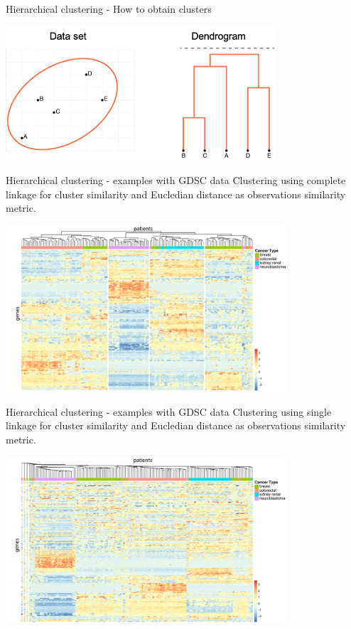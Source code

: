 \documentclass[notes]{beamer}          %
\begin{document}
\begin{frame}{Hierarchical clustering - How to obtain clusters}
\begin{center}
\includegraphics[height=5cm]{../figures/week_6/HierarchicalClustering_clusters_5.png}  
\end{center}
\end{frame}

\begin{frame}{Hierarchical clustering - examples with GDSC data}
Clustering using complete linkage for cluster similarity and Eucledian distance as observations similarity metric.
\begin{center}
\includegraphics[height=6.2cm]{../figures/week_6/GDSC_heatmap_complete.pdf}  
\end{center}
\end{frame}

\begin{frame}{Hierarchical clustering - examples with GDSC data}
Clustering using single linkage for cluster similarity and Eucledian distance as observations similarity metric.\begin{center}
\includegraphics[height=6.2cm]{../figures/week_6/GDSC_heatmap_single.pdf}  
\end{center}
\end{frame}
\end{document}
